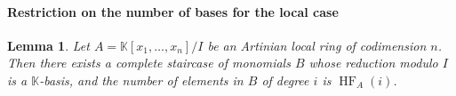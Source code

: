 \documentclass[a4paper,11p]{amsart}
\newtheorem{lemma0}[defn0]{Lemma}
\newenvironment{lemma}{\bigskip \begin{lemma0}}{\end{lemma0}}
\newcommand{\K}{\mathbb K}
\begin{document}
%



\paragraph{\textbf{Restriction on the number of bases for the local case}}
\begin{lemma}\label{lemma: BasisFromHF}
    Let $A= \K[x_1 , \ldots , x_n]/I$ be an Artinian local ring of codimension $n$. Then there exists a complete staircase of monomials $B$ whose reduction modulo $I$ is a $\K$-basis, and the number of elements in $B$ of degree $i$ is $\operatorname{HF}_A(i)$.
\end{lemma}
\end{document}
